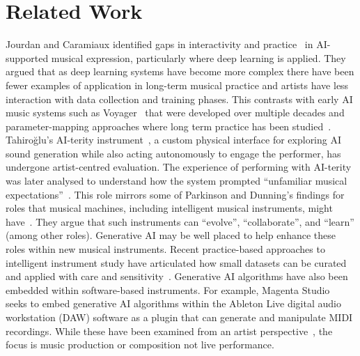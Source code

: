 \documentclass[sigconf]{nimeart}
\begin{document}
\section{Related Work}\label{related-work}


Jourdan and Caramiaux identified gaps in interactivity and practice~\cite{jourdan_nime_ml_review} in AI-supported musical expression, particularly where deep learning is applied. 
They argued that as deep learning systems have become more complex there have been fewer examples of application in long-term musical practice and artists have less interaction with data collection and training phases. 
This contrasts with early AI music systems such as Voyager~\cite{Lewis:2000fu} that were developed over multiple decades and parameter-mapping approaches where long term practice has been studied~\cite{fiebrink_years_ml}.
Tahiroğlu's AI-terity instrument~\cite{tahiroglu-aiterity-2021}, a custom physical interface for exploring AI sound generation while also acting autonomously to engage the performer, has undergone  artist-centred evaluation. 
The experience of performing with AI-terity was later analysed to understand how the system prompted ``unfamiliar musical expectations''~\cite{tahirouglu-evolving-2022}.
This role mirrors some of Parkinson and Dunning's findings for roles that musical machines, including intelligent musical instruments, might have~\cite{taxonomy-music-interactions-parkinson-2025}. They argue that such instruments can ``evolve'', ``collaborate'', and ``learn'' (among other roles). Generative AI may be well placed to help enhance these roles within new musical instruments. 
Recent practice-based approaches to intelligent instrument study have articulated how small datasets can be curated and applied with care and sensitivity~\cite{stefansdottir_intelligent_2025}.
Generative AI algorithms have also been embedded within software-based instruments. For example, Magenta Studio~\cite{magenta-studio-2019} seeks to embed generative AI algorithms within the Ableton Live digital audio workstation (DAW) software as a plugin that can generate and manipulate MIDI recordings. While these have been examined from an artist perspective~\cite{Davis:2022}, the focus is music production or composition not live performance.

\end{document}
